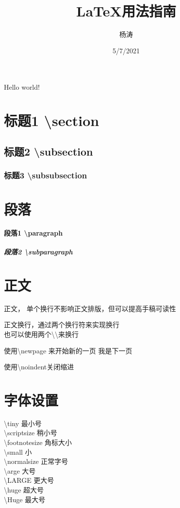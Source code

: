 \documentclass{article}
\title{LaTeX用法指南}
\author{杨涛}
\date{5/7/2021}
\begin{document}
 

	
	\maketitle
	\tableofcontents 
	
	Hello world! 
	\section{标题1 \textbackslash section} 
	\subsection{标题2 \textbackslash subsection} 
	\subsubsection{标题3 \textbackslash subsubsection}
	
	\section{段落}
	\paragraph{段落1 \textbackslash paragraph} 
	\subparagraph{段落2 \textbackslash subparagraph}
	
	\section{正文}
	正文，
	单个换行不影响正文排版，但可以提高手稿可读性
	
	正文换行，通过两个换行符来实现换行\\也可以使用两个\textbackslash\textbackslash 来换行
	
	使用\textbackslash newpage 来开始新的一页\newpage
	我是下一页
	
	\noindent 使用\textbackslash noindent关闭缩进
	
	\section{字体设置}
	\noindent
	\tiny \textbackslash tiny 最小号\\
	\scriptsize \textbackslash scriptsize 稍小号\\
	\footnotesize \textbackslash footnotesize 角标大小\\
	\small \textbackslash small 小\\
	\normalsize \textbackslash normalsize 正常字号\\
	\large \textbackslash arge 大号\\
	\LARGE \textbackslash LARGE 更大号\\
	\huge \textbackslash huge 超大号\\
	\Huge \textbackslash Huge 最大号\\
	
\end{document}
